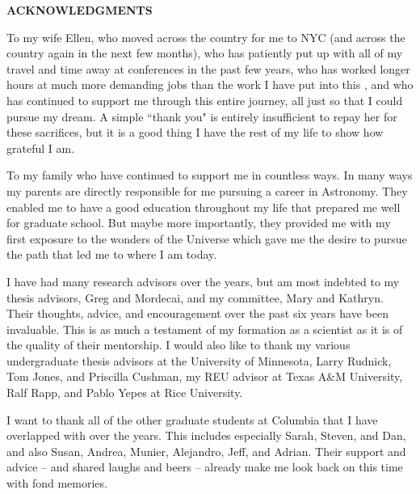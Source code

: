 %
%
%
%

\newpage

\begin{center}

{\large \bf ACKNOWLEDGMENTS } %

\end{center}

\vspace{0.8cm}

To my wife Ellen, who moved across the country for me to NYC
(and across the country again in the next few months), who has patiently put up with
all of my travel and time away at conferences in the past few years,
who has worked longer hours at much more demanding jobs than the work I have put
into this \Dissertation, and who has continued to support me through this
entire journey, all just so that I could pursue my dream. A simple ``thank you" is
entirely insufficient to repay her for these sacrifices, but it is a good thing
I have the rest of my life to show how grateful I am.

To my family who have continued to support me in countless ways.
In many ways my parents are directly responsible for me pursuing a career in Astronomy.
They enabled me to have a good education throughout my life that prepared me
well for graduate school. But maybe more importantly, they provided me with my
first exposure to the wonders of the Universe which gave me the desire to
pursue the path that led me to where I am today.

I have had many research advisors over the years, but am most indebted to
my thesis advisors, Greg and Mordecai, and my committee, Mary and Kathryn. Their
thoughts, advice, and encouragement over the past six years have been invaluable.
This \dissertation  is as much a testament of my formation as a scientist as it
is of the quality of their mentorship. I would also like to thank my various
undergraduate thesis advisors at the University of Minnesota,
Larry Rudnick, Tom Jones, and Priscilla Cushman, my REU advisor at
Texas A\&M University, Ralf Rapp, and Pablo Yepes at Rice University.

I want to thank all of the other graduate students at Columbia that I have overlapped
with over the years. This includes especially Sarah, Steven, and Dan,
and also Susan, Andrea, Munier, Alejandro, Jeff, and Adrian.
Their support and advice -- and shared laughs and beers --
already make me look back on this time with fond memories.

